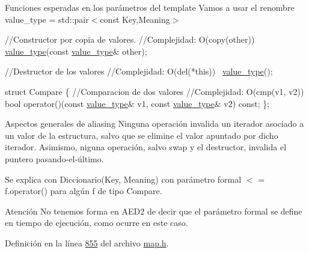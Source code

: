 \begin{DoxyParagraph}{Funciones esperadas en los parámetros del template}
Vamos a usar el renombre value\+\_\+type = std\+::pair$<$const Key,\+Meaning$>$


\begin{DoxyCode}
\textcolor{comment}{//Constructor por copia de valores.}
\textcolor{comment}{//Complejidad: O(copy(other))}
\hyperlink{classaed2_1_1map_a719db98e0ff9a837610f76be33264680_a719db98e0ff9a837610f76be33264680}{value\_type}(\textcolor{keyword}{const} \hyperlink{classaed2_1_1map_a719db98e0ff9a837610f76be33264680_a719db98e0ff9a837610f76be33264680}{value\_type}& other);

\textcolor{comment}{//Destructor de los valores}
\textcolor{comment}{//Complejidad: O(del(*this))}
~\hyperlink{classaed2_1_1map_a719db98e0ff9a837610f76be33264680_a719db98e0ff9a837610f76be33264680}{value\_type}();

\textcolor{keyword}{struct }Compare \{
  \textcolor{comment}{//Comparacion de dos valores}
  \textcolor{comment}{//Complejidad: O(cmp(v1, v2))}
  \textcolor{keywordtype}{bool} operator()(\textcolor{keyword}{const} \hyperlink{classaed2_1_1map_a719db98e0ff9a837610f76be33264680_a719db98e0ff9a837610f76be33264680}{value\_type}& v1, \textcolor{keyword}{const} \hyperlink{classaed2_1_1map_a719db98e0ff9a837610f76be33264680_a719db98e0ff9a837610f76be33264680}{value\_type}& v2) \textcolor{keyword}{const};
\};
\end{DoxyCode}
 
\end{DoxyParagraph}


\begin{DoxyParagraph}{Aspectos generales de aliasing}
Ninguna operación invalida un iterador asociado a un valor de la estructura, salvo que se elimine el valor apuntado por dicho iterador. Asimismo, niguna operación, salvo swap y el destructor, invalida el puntero pasando-\/el-\/último.
\end{DoxyParagraph}
\begin{DoxyParagraph}{Se explica con}
Diccionario(Key, Meaning) con parámetro formal $<$ = f.\+operator() para algún f de tipo Compare.
\end{DoxyParagraph}
\begin{DoxyAttention}{Atención}
No tenemos forma en A\+E\+D2 de decir que el parámetro formal se define en tiempo de ejecución, como ocurre en este caso. 
\end{DoxyAttention}


Definición en la línea \hyperlink{map_8h_source_l00855}{855} del archivo \hyperlink{map_8h_source}{map.\+h}.



